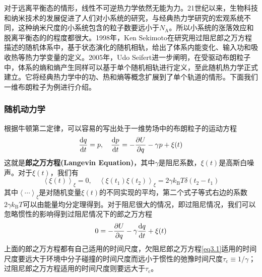 对于远离平衡态的情形，线性不可逆热力学依然无能为力。21世纪以来，生物科技和纳米技术的发展促进了人们对小系统的研究，与经典热力学研究的宏观系统不同，这种纳米尺度的小系统包含的粒子数要远小于$N_{\mathrm{A}}$。所以小系统的涨落效应和脱离平衡态的的程度都很大。1998年，Ken Sekimoto在研究用过阻尼郎之万方程描述的随机体系中，基于状态演化的随机相轨，给出了体系内能变化、输入功和吸收热等热力学变量的定义\cite{Sekimoto1998}。2005年，Udo Seifert进一步阐明，在受驱动布朗粒子中，体系的熵和熵产生同样可以基于单个随机相轨进行定义\cite{Seifert2005}，至此随机热力学正式建立。它将经典热力学中的功、热和熵等概念扩展到了单个轨道的情形。下面我们一维布朗粒子为例进行介绍。

\subsubsection{随机动力学}
\qquad 根据牛顿第二定律，可以容易的写出处于一维势场中的布朗粒子的运动方程
\begin{equation}
    \frac{\mathrm{d} q}{\mathrm{d} t}=p, \quad \frac{\mathrm{d} p}{\mathrm{d} t}=-\frac{\partial U}{\partial q}-\gamma p+\xi(t)
    \label{eq1.1}
\end{equation}
这就是\textbf{郎之万方程(Langevin Equation)}，其中$\gamma$是阻尼系数，$\xi(t)$是高斯白噪声。对于$\xi(t)$，我们有
\begin{equation}
    \left\langle\xi\left(t\right)\right\rangle_{\xi}=0,\quad \left\langle\xi\left(t_{1}\right) \xi\left(t_{2}\right)\right\rangle_{\xi}=2 \gamma k_{\mathrm{B}} T  \delta\left(t_{2}-t_{1}\right)
    \label{eq1.2}
\end{equation}
其中$\left\langle \cdots \right\rangle_{\xi}$是对随机变量$\xi(t)$的不同实现的平均，第二个式子等式右边的系数$2 \gamma k_{\mathrm{B}} T$可以由能量均分定理得到。\cite{Reichl2016}对于阻尼很大的情况，即过阻尼情况，我们可以忽略惯性的影响得到过阻尼情况下的郎之万方程
\begin{equation}
    0=-\frac{\partial U}{\partial q}-\gamma \frac{\mathrm{d} q}{\mathrm{d} t}+\xi(t)
    \label{eq1.3}
\end{equation}
上面的郎之万方程都有自己适用的时间尺度，欠阻尼郎之万方程\eqref{eq3.1}适用的时间尺度要远大于环境中分子碰撞的时间尺度而远小于惯性的弛豫时间尺度$\tau_{\mathrm{c}}\equiv1/\gamma$；过阻尼郎之万方程适用的时间尺度则要远大于$\tau_{\mathrm{c}}$。\cite{Sekimoto2010}
